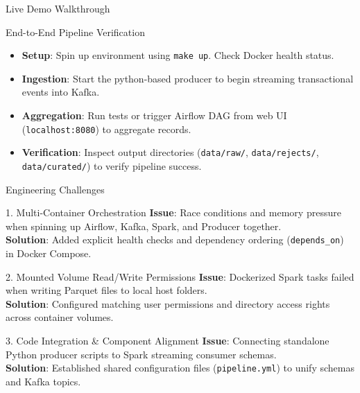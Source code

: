 \documentclass[10pt]{beamer}
\begin{document}
\begin{frame}{Live Demo Walkthrough}
  \begin{block}{End-to-End Pipeline Verification}
    \begin{itemize}
      \item \textbf{Setup}: Spin up environment using \texttt{make up}. Check Docker health status.
      \item \textbf{Ingestion}: Start the python-based producer to begin streaming transactional events into Kafka.
      \item \textbf{Aggregation}: Run tests or trigger Airflow DAG from web UI (\texttt{localhost:8080}) to aggregate records.
      \item \textbf{Verification}: Inspect output directories (\texttt{data/raw/}, \texttt{data/rejects/}, \texttt{data/curated/}) to verify pipeline success.
    \end{itemize}
  \end{block}
\end{frame}

\begin{frame}{Engineering Challenges}
  \small
  \begin{block}{1. Multi-Container Orchestration}
    \textbf{Issue}: Race conditions and memory pressure when spinning up Airflow, Kafka, Spark, and Producer together.\\
    \textbf{Solution}: Added explicit health checks and dependency ordering (\texttt{depends\_on}) in Docker Compose.
  \end{block}

  \begin{block}{2. Mounted Volume Read/Write Permissions}
    \textbf{Issue}: Dockerized Spark tasks failed when writing Parquet files to local host folders.\\
    \textbf{Solution}: Configured matching user permissions and directory access rights across container volumes.
  \end{block}

  \begin{block}{3. Code Integration & Component Alignment}
    \textbf{Issue}: Connecting standalone Python producer scripts to Spark streaming consumer schemas.\\
    \textbf{Solution}: Established shared configuration files (\texttt{pipeline.yml}) to unify schemas and Kafka topics.
  \end{block}
\end{frame}
\end{document}
